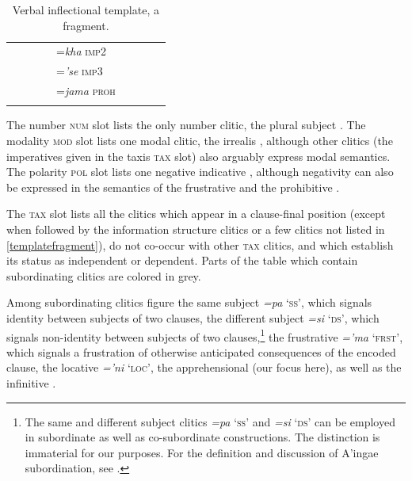 \documentclass[output=paper,colorlinks,citecolor=brown]{langscibook}
\begin{document}
\begin{table}[t]
\begin{tabularx}{\textwidth}{l Q Q Q Q Q Q Q l}
\tablevspace
&        &      &       &=\textit{kha}\newline
                         \textsc{imp2} & &        & \\
\tablevspace
&        &      &       &=\textit{'se}\newline
                         \textsc{imp3}& &        & \\
\tablevspace
&        &      &       &=\textit{jama}\newline
                         \textsc{proh}& &        & \\
\lspbottomrule
\end{tabularx}
\caption{Verbal inflectional template, a fragment.}
\label{templatefragment}
\end{table}

The number \textsc{num} slot lists the only number clitic, the plural subject . The modality \textsc{mod} slot lists one modal clitic, the irrealis , although other clitics (\eg the imperatives given in the taxis \textsc{tax} slot) also arguably express modal semantics. The polarity \textsc{pol} slot lists one negative indicative , although negativity can also be expressed in the semantics of the frustrative  and the prohibitive .

The \textsc{tax} slot lists all the clitics which appear in a clause-final position (except when followed by the information structure clitics or a few clitics not listed in \autoref{templatefragment}), do not co-occur with other \textsc{tax} clitics, and which establish its status as independent or dependent. {Parts of the table which contain subordinating clitics are colored in grey.}

Among subordinating clitics figure the same subject \emph{=pa} `\textsc{ss}', which signals identity between subjects of two clauses, the different subject \emph{=si} `\textsc{ds}', which signals non-identity between subjects of two clauses,\footnote{The same and different subject clitics \emph{=pa} `\textsc{ss}' and \emph{=si} `\textsc{ds}' can be employed in subordinate as well as co-subordinate constructions. The distinction is immaterial for our purposes. For the definition and discussion of A'ingae subordination, see \citet{fischer2007clause}.} the frustrative \emph{='ma} `\textsc{frst}',  which signals a frustration of otherwise anticipated consequences of the encoded clause, the locative \emph{='ni} `\textsc{loc}', the apprehensional  (our focus here), as well as the infinitive .
\end{document}
